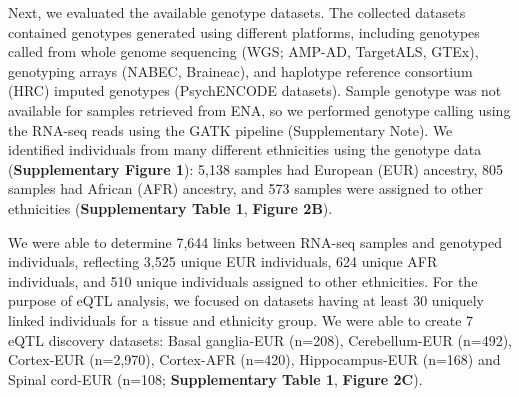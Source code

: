 {{Next, we evaluated the available genotype datasets. The collected datasets contained genotypes generated using different platforms, including genotypes called from whole genome sequencing (WGS; AMP-AD\cite{hodesAcceleratingMedicinesPartnership2016}, TargetALS\cite{prudencioDistinctBrainTranscriptome2015}, GTEx\cite{donovanCellularDeconvolutionGTEx2020}), genotyping arrays (NABEC\cite{DbGaPStudy}, Braineac\cite{ramasamyGeneticVariabilityRegulation2014}), and haplotype reference consortium (HRC)\cite{mccarthyReferencePanel642016} imputed genotypes (PsychENCODE datasets). Sample genotype was not available for samples retrieved from ENA, so we performed genotype calling using the RNA-seq reads using the GATK\cite{mckennaGenomeAnalysisToolkit2010} pipeline (Supplementary Note). We identified individuals from many different ethnicities using the genotype data (\textbf{Supplementary Figure 1}): 5,138 samples had European (EUR) ancestry, 805 samples had African (AFR) ancestry, and 573 samples were assigned to other ethnicities (\textbf{Supplementary Table 1}, \textbf{Figure 2B}). 

We were able to determine 7,644 links between RNA-seq samples and genotyped individuals, reflecting 3,525 unique EUR individuals, 624 unique AFR individuals, and 510 unique individuals assigned to other ethnicities. For the purpose of eQTL analysis, we focused on datasets having at least 30 uniquely linked individuals for a tissue and ethnicity group. We were able to create 7 eQTL discovery datasets: Basal ganglia-EUR (n=208), Cerebellum-EUR (n=492), Cortex-EUR (n=2,970), Cortex-AFR (n=420), Hippocampus-EUR (n=168) and Spinal cord-EUR (n=108; \textbf{Supplementary Table 1}, \textbf{Figure 2C}). 

}}
